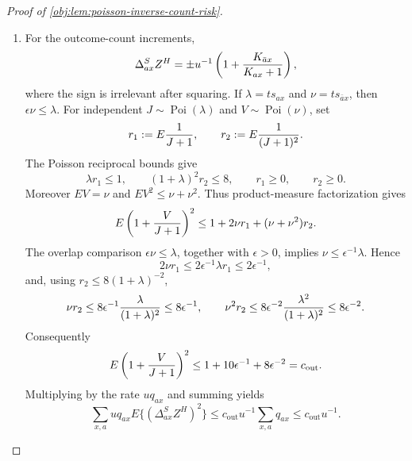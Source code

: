 \documentclass[11pt]{article}
\begin{document}
\begin{proof}[Proof of \cref{obj:lem:poisson-inverse-count-risk}]
\begin{enumerate}
\item
For the outcome-count increments,
\[
\Delta^S_{ax}Z^H
=
\pm u^{-1}\left(1+{K_{\bar a x}\over K_{ax}+1}\right),
\]
where the sign is irrelevant after squaring.  If
\(\lambda=ts_{ax}\) and \(\nu=ts_{\bar a x}\), then \(\epsilon\nu\le\lambda\).  For independent
\(J\sim\operatorname{Poi}(\lambda)\) and \(V\sim\operatorname{Poi}(\nu)\), set
\[
r_1:=E{1\over J+1},
\qquad
r_2:=E{1\over (J+1)^2}.
\]
The Poisson reciprocal bounds give
\[
\lambda r_1\le1,
\qquad
(1+\lambda)^2r_2\le8,
\qquad
r_1\ge0,
\qquad
r_2\ge0.
\]
Moreover \(E V=\nu\) and \(E V^2\le \nu+\nu^2\).  Thus product-measure factorization gives
\[
E\left(1+{V\over J+1}\right)^2
\le
1+2\nu r_1+(\nu+\nu^2)r_2.
\]
The overlap comparison \(\epsilon\nu\le\lambda\), together with \(\epsilon>0\), implies \(\nu\le\epsilon^{-1}\lambda\).  Hence
\[
2\nu r_1\le 2\epsilon^{-1}\lambda r_1\le2\epsilon^{-1},
\]
and, using \(r_2\le 8(1+\lambda)^{-2}\),
\[
\nu r_2
\le
8\epsilon^{-1}{\lambda\over(1+\lambda)^2}
\le 8\epsilon^{-1},
\qquad
\nu^2r_2
\le
8\epsilon^{-2}{\lambda^2\over(1+\lambda)^2}
\le8\epsilon^{-2}.
\]
Consequently
\[
E\left(1+{V\over J+1}\right)^2
\le
1+10\epsilon^{-1}+8\epsilon^{-2}
=
c_{\mathrm{out}}.
\]
Multiplying by the rate \(uq_{ax}\) and summing yields
\[
\sum_{x,a}u q_{ax}E\{(\Delta^S_{ax}Z^H)^2\}
\le
c_{\mathrm{out}}u^{-1}\sum_{x,a}q_{ax}
\le
c_{\mathrm{out}}u^{-1}.
\]


\end{enumerate}
\end{proof}
\end{document}
